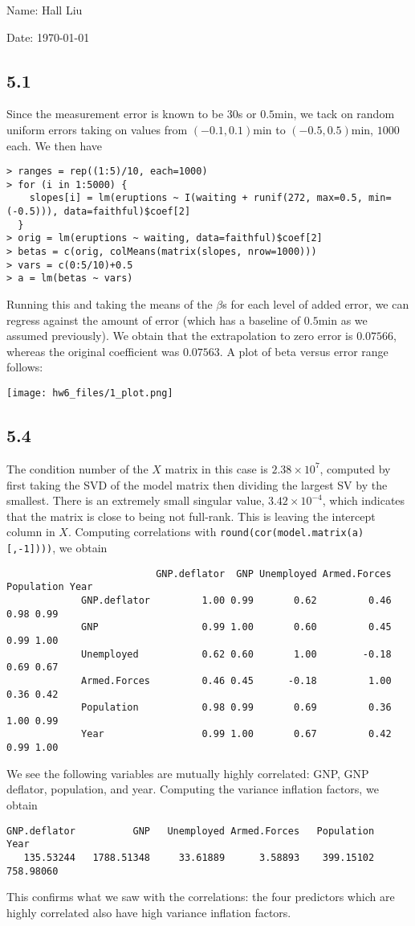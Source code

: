 \documentclass{article}
\begin{document}
Name: Hall Liu

Date: \today 
\vspace{1.5cm}

\subsection*{5.1}
Since the measurement error is known to be $30$s or $0.5$min, we tack on random uniform errors taking on values from $(-0.1,0.1)$min to $(-0.5,0.5)$min, $1000$ each. We then have
\begin{verbatim}
> ranges = rep((1:5)/10, each=1000)
> for (i in 1:5000) {
    slopes[i] = lm(eruptions ~ I(waiting + runif(272, max=0.5, min=(-0.5))), data=faithful)$coef[2] 
  }
> orig = lm(eruptions ~ waiting, data=faithful)$coef[2]
> betas = c(orig, colMeans(matrix(slopes, nrow=1000)))
> vars = c(0:5/10)+0.5
> a = lm(betas ~ vars)
\end{verbatim}
Running this and taking the means of the $\beta$s for each level of added error, we can regress against the amount of error (which has a baseline of $0.5$min as we assumed previously). We obtain that the extrapolation to zero error is $0.07566$, whereas the original coefficient was $0.07563$. A plot of beta versus error range follows: 

\texttt{[image: hw6\_files/1\_plot.png]}
\subsection*{5.4}
The condition number of the $X$ matrix in this case is $2.38\times10^7$, computed by first taking the SVD of the model matrix then dividing the largest SV by the smallest. There is an extremely small singular value, $3.42\times10^{-4}$, which indicates that the matrix is close to being not full-rank. This is leaving the intercept column in $X$.
Computing correlations with \verb|round(cor(model.matrix(a)[,-1])))|, we obtain
\begin{verbatim}
                          GNP.deflator  GNP Unemployed Armed.Forces Population Year
             GNP.deflator         1.00 0.99       0.62         0.46       0.98 0.99
             GNP                  0.99 1.00       0.60         0.45       0.99 1.00
             Unemployed           0.62 0.60       1.00        -0.18       0.69 0.67
             Armed.Forces         0.46 0.45      -0.18         1.00       0.36 0.42
             Population           0.98 0.99       0.69         0.36       1.00 0.99
             Year                 0.99 1.00       0.67         0.42       0.99 1.00
\end{verbatim}             
We see the following variables are mutually highly correlated: GNP, GNP deflator, population, and year.
Computing the variance inflation factors, we obtain
\begin{verbatim}
GNP.deflator          GNP   Unemployed Armed.Forces   Population         Year 
   135.53244   1788.51348     33.61889      3.58893    399.15102    758.98060 
\end{verbatim}
This confirms what we saw with the correlations: the four predictors which are highly correlated also have high variance inflation factors.
\end{document}
